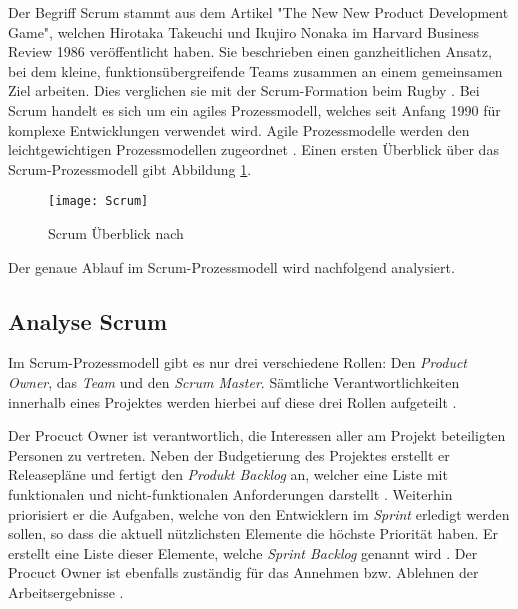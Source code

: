 Der Begriff Scrum stammt aus dem Artikel "The New New Product Development Game", welchen Hirotaka Takeuchi und Ikujiro Nonaka im Harvard Business Review 1986 veröffentlicht haben. Sie beschrieben einen ganzheitlichen Ansatz, bei dem kleine, funktionsübergreifende Teams zusammen an einem gemeinsamen Ziel arbeiten. Dies verglichen sie mit der Scrum-Formation beim Rugby \cite{Pham2012,Takeuchi1986}. \newline
Bei Scrum handelt es sich um ein agiles Prozessmodell, welches seit Anfang 1990 für komplexe Entwicklungen verwendet wird. Agile Prozessmodelle werden den leichtgewichtigen Prozessmodellen zugeordnet \cite{Hanser2010, Lacey2012}. Einen ersten Überblick über das Scrum-Prozessmodell gibt Abbildung \ref{fig:Scrum}.
\begin{figure}[htp]
\begin{center}
  \texttt{[image: Scrum]} %
  \caption{Scrum Überblick nach \cite{scrum2008}}
  \label{fig:Scrum}
\end{center}
\end{figure}
Der genaue Ablauf im Scrum-Prozessmodell wird nachfolgend analysiert.

\subsection{Analyse Scrum}


Im Scrum-Prozessmodell gibt es nur drei verschiedene Rollen: Den \textit{Product Owner}, das \textit{Team} und den \textit{Scrum Master}. Sämtliche Verantwortlichkeiten innerhalb eines Projektes werden hierbei auf diese drei Rollen aufgeteilt \cite{Schwaber2004}. \newline

Der Procuct Owner ist verantwortlich, die Interessen aller am Projekt beteiligten Personen zu vertreten. Neben der Budgetierung des Projektes erstellt er  Releasepläne und fertigt den \textit{Produkt Backlog} an, welcher eine Liste mit funktionalen und nicht-funktionalen Anforderungen darstellt \cite{Schwaber2004, Pichler2010,Schwaber2007}. Weiterhin priorisiert er die Aufgaben, welche von den Entwicklern im \textit{Sprint} erledigt werden sollen, so dass die aktuell nützlichsten Elemente die höchste Priorität haben. Er erstellt eine Liste dieser Elemente, welche \textit{Sprint Backlog} genannt wird \cite{Henning2011, Schwaber2007,Pichler2010}. Der Procuct Owner ist ebenfalls zuständig für das Annehmen bzw. Ablehnen der Arbeitsergebnisse \cite{eclipseScrum}. \newline

